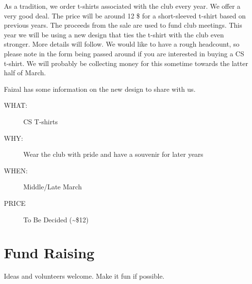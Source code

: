 As a tradition, we order t-shirts associated with the club every year. We offer
a very good deal. The price will be around 12 \$ for a short-sleeved t-shirt
based on previous years. The proceeds from the sale are used to fund club
meetings. This year we will be using a new design that ties the t-shirt with
the club even stronger. More details will follow. We would like to have a rough
headcount, so please note in the form being passed around if you are interested
in buying a CS t-shirt. We will probably be collecting money for this sometime
towards the latter half of March.

Faizal has some information on the new design to share with us.

\begin{description}
\item[{WHAT:}] CS T-shirts
\item[{WHY:}] Wear the club with pride and have a souvenir for later years
\item[{WHEN:}] Middle/Late March
\item[{PRICE}] To Be Decided (\textasciitilde{}\$12)
\end{description}


\newpage


\section{Fund Raising}
\label{sec-11}

Ideas and volunteers welcome. Make it fun if possible.


